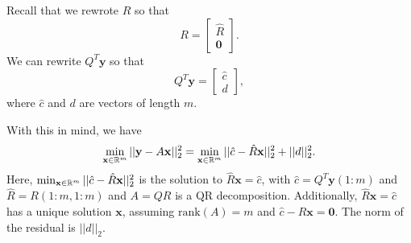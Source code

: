 \documentclass[letterpaper]{article}
\newcommand{\0}{\mathbf{0}}
\newcommand{\y}{\mathbf{y}}
\newcommand{\x}{\mathbf{x}}
\begin{document}
\begin{enumerate}
    Recall that we rewrote $R$ so that \[R = \begin{bmatrix}
        \hat{R} \\ \0
    \end{bmatrix}.\] We can rewrite $Q^T \y$ so that \[Q^T \y = \begin{bmatrix}
        \hat{c} \\ d
    \end{bmatrix},\] where $\hat{c}$ and $d$ are vectors of length $m$.  
\end{enumerate}
With this in mind, we have 
\[\min_{\x \in \R^m} ||\y - A\x||_2^2 = \min_{\x \in \R^m} ||\hat{c} - \hat{R}\x||_2^2 + ||d||_2^2.\]
Here, $\min_{\x \in \R^m} ||\hat{c} - \hat{R}\x||_2^2$ is the solution to $\hat{R}\x = \hat{c}$, with $\hat{c} = Q^T \y(1 : m)$ and $\hat{R} = R(1:m, 1:m)$ and $A = QR$ is a QR decomposition. Additionally, $\hat{R}\x = \hat{c}$ has a unique solution $\x$, assuming $\text{rank}(A) = m$ and $\hat{c} - \hat{R}\x = \0$. The norm of the residual is $||d||_2$. 
\end{document}
